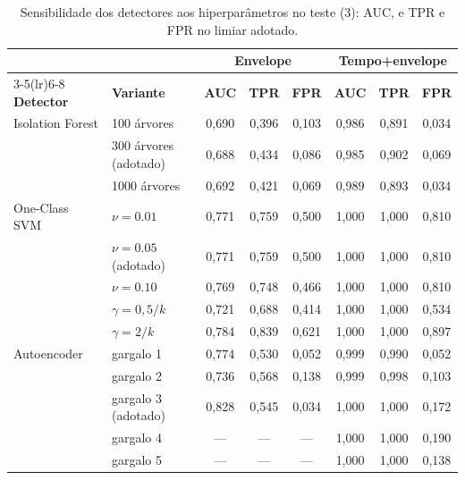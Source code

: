 \begin{table}[htb]
  \centering
  \caption{Sensibilidade dos detectores aos hiperparâmetros no teste
  (\SI{3}{\hp}): AUC, e TPR e FPR no limiar adotado.}
  \label{tab:sens-det}
  \footnotesize
  \begin{tabular}{llcccccc}
    \toprule
    & & \multicolumn{3}{c}{\textbf{Envelope}} & \multicolumn{3}{c}{\textbf{Tempo+envelope}} \\
    \cmidrule(lr){3-5}\cmidrule(lr){6-8}
    \textbf{Detector} & \textbf{Variante} & \textbf{AUC} & \textbf{TPR} & \textbf{FPR} & \textbf{AUC} & \textbf{TPR} & \textbf{FPR} \\
    \midrule
    Isolation Forest & 100 árvores          & 0,690 & 0,396 & 0,103 & 0,986 & 0,891 & 0,034 \\
                     & 300 árvores (adotado) & 0,688 & 0,434 & 0,086 & 0,985 & 0,902 & 0,069 \\
                     & 1000 árvores         & 0,692 & 0,421 & 0,069 & 0,989 & 0,893 & 0,034 \\
    \midrule
    One-Class SVM    & $\nu = \num{0.01}$          & 0,771 & 0,759 & 0,500 & 1,000 & 1,000 & 0,810 \\
                     & $\nu = \num{0.05}$ (adotado) & 0,771 & 0,759 & 0,500 & 1,000 & 1,000 & 0,810 \\
                     & $\nu = \num{0.10}$          & 0,769 & 0,748 & 0,466 & 1,000 & 1,000 & 0,810 \\
                     & $\gamma = 0{,}5/k$          & 0,721 & 0,688 & 0,414 & 1,000 & 1,000 & 0,534 \\
                     & $\gamma = 2/k$              & 0,784 & 0,839 & 0,621 & 1,000 & 1,000 & 0,897 \\
    \midrule
    Autoencoder      & gargalo 1          & 0,774 & 0,530 & 0,052 & 0,999 & 0,990 & 0,052 \\
                     & gargalo 2          & 0,736 & 0,568 & 0,138 & 0,999 & 0,998 & 0,103 \\
                     & gargalo 3 (adotado) & 0,828 & 0,545 & 0,034 & 1,000 & 1,000 & 0,172 \\
                     & gargalo 4          & ---   & ---   & ---   & 1,000 & 1,000 & 0,190 \\
                     & gargalo 5          & ---   & ---   & ---   & 1,000 & 1,000 & 0,138 \\
    \bottomrule
  \end{tabular}
\end{table}

